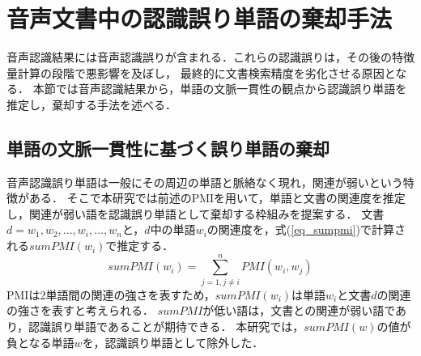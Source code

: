 %
\chapter{音声文書中の認識誤り単語の棄却手法}

音声認識結果には音声認識誤りが含まれる．これらの認識誤りは，その後の特徴量計算の段階で悪影響を及ぼし，
最終的に文書検索精度を劣化させる原因となる．
本節では音声認識結果から，単語の文脈一貫性の観点から認識誤り単語を推定し，棄却する手法を述べる．
%


\section{単語の文脈一貫性に基づく誤り単語の棄却}  \label{sec_word_rejection}
音声認識誤り単語は一般にその周辺の単語と脈絡なく現れ，関連が弱いという特徴がある．
そこで本研究では前述のPMIを用いて，単語と文書の関連度を推定し，関連が弱い語を認識誤り単語として棄却する枠組みを提案する．
文書$d = {w_1, w_2, ..., w_i, ..., w_n}$と，$d$中の単語$w_i$の関連度を，式(\ref{eq_sumpmi})で計算される$sumPMI(w_i)$で推定する．
\begin{equation}
    sumPMI(w_i) = \sum^{n}_{j=1, j \neq i}{PMI(w_i, w_j)}   \label{eq_sumpmi}
\end{equation}
PMIは2単語間の関連の強さを表すため，$sumPMI(w_i)$は単語$w_i$と文書$d$の関連の強さを表すと考えられる．
$sumPMI$が低い語は，文書との関連が弱い語であり，認識誤り単語であることが期待できる．
本研究では，$sumPMI(w)$の値が負となる単語$w$を，認識誤り単語として除外した．

